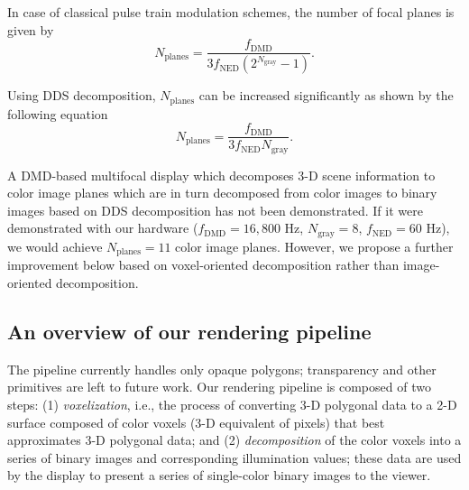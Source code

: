 In case of classical pulse train modulation schemes, the number of focal planes is given by
\begin{equation}
N_{\text{planes}} = \frac{f_{\text{DMD}}}{3 f_{\text{NED}} (2^{N_{\text{gray}}}-1)}.
\end{equation}

Using DDS decomposition, $N_{\text{planes}}$ can be increased significantly as shown by the following equation
\begin{equation}
N_{\text{planes}} = \frac{f_{\text{DMD}}}{3 f_{\text{NED}} N_{\text{gray}}}.
\end{equation}

A DMD-based multifocal display which decomposes 3-D scene information to color image planes which are in turn decomposed from color images to binary images based on DDS decomposition has not been demonstrated. If it were demonstrated with our hardware ($f_{\text{DMD}} = 16,800$ Hz, $N_{\text{gray}}=8$, $f_{\text{NED}}=60$ Hz), we would achieve $N_{\text{planes}}=11$ color image planes. However, we propose a further improvement below based on voxel-oriented decomposition rather than image-oriented decomposition. 




\subsection{An overview of our rendering pipeline}
The pipeline currently handles only opaque polygons; transparency and other primitives are left to future work. Our rendering pipeline is composed of two steps: (1)  \emph{voxelization}, i.e., the process of converting 3-D polygonal data to a 2-D surface composed of color voxels (3-D equivalent of pixels) that best approximates 3-D polygonal data; and (2) \emph{decomposition} of the color voxels into a series of binary images and corresponding illumination values; these data are used by the display to present a series of single-color binary images to the viewer. 


